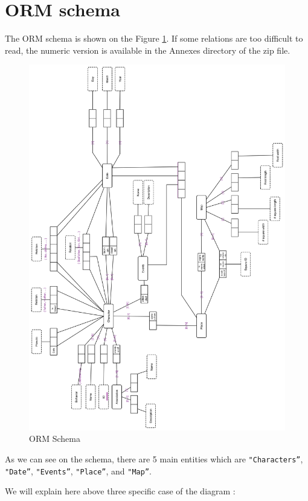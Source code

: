 \documentclass[a4paper ,12pt,french]{article}
\begin{document}
\section{ORM schema}


The ORM schema is shown on the Figure \ref{orm}. If some relations are too difficult to read, the numeric version is available in the Annexes directory of the zip file.\\
\begin{figure}[!h]
\includegraphics[scale=0.43]{ORM.png}
\caption{ORM Schema}
\label{orm}
\end{figure}

As we can see on the schema, there are 5 main entities which are \texttt{"Characters''}, \texttt{"Date''}, \texttt{"Events''}, \texttt{"Place''}, and \texttt{"Map''}.


We will explain here above three specific case of the diagram :\\
\end{document}
